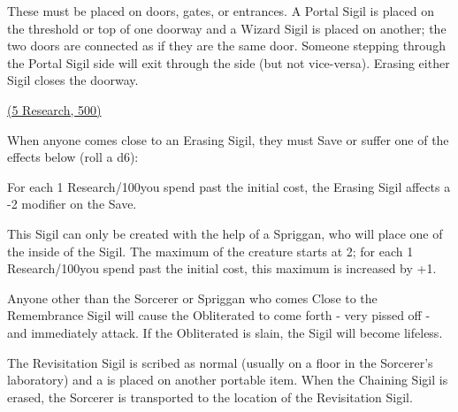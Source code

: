 {

These must be placed on doors, gates, or entrances.  A Portal Sigil is placed on the threshold or top of one doorway and a Wizard Sigil is placed on another; the two doors are connected as if they are the same door.  Someone stepping through the Portal Sigil side will exit through the  side (but not vice-versa).  Erasing either Sigil closes the doorway.

\large{\underline{ (5 Research, 500\AU)}}\normalsize



When anyone comes close to an Erasing Sigil, they must Save or suffer one of the effects below (roll a d6):


For each 1 Research/100\AU you spend past the initial cost, the Erasing Sigil affects a -2 modifier on the Save.

\cbreak


This Sigil can only be created with the help of a Spriggan, who will place one of the  inside of the Sigil.  The maximum \HD of the creature starts at 2; for each 1 Research/100\AU you spend past the initial cost, this maximum is increased by +1.

Anyone other than the Sorcerer or Spriggan who comes Close to the Remembrance Sigil will cause the Obliterated to come forth - very pissed off - and immediately attack.  If the Obliterated is slain, the Sigil will become lifeless.



The Revisitation Sigil is scribed as normal (usually on a floor in the Sorcerer's laboratory) and a  is placed on another portable item.  When the Chaining Sigil is erased, the Sorcerer is transported to the location of the Revisitation Sigil.  

}
